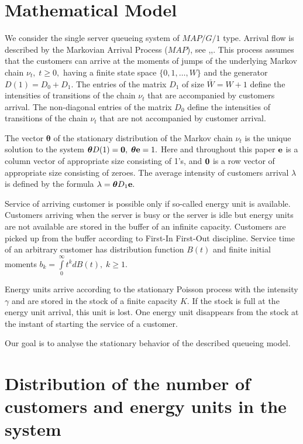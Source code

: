 \documentclass[runningheads]{llncs}
\begin{document}
\section{Mathematical Model}
We consider the single server queueing system of $MAP/G/1$ type. Arrival flow is described by the Markovian Arrival Process ($MAP$), see \cite{chak},\cite{luk},\cite{vd}. This process assumes that the customers can arrive at the moments of jumps of the underlying Markov chain $\nu_t,\; t \ge 0,$ having a finite state space $\{0,1,\dots,W\}$ and the generator $D(1)=D_0+D_1.$
The entries of the matrix $D_1$ of size $\bar W=W+1$ define the intensities of transitions of the chain $\nu_t$ that are accompanied by customers arrival. The non-diagonal entries of the matrix $D_0$  define the intensities of transitions of the chain $\nu_t$ that are not accompanied by customer arrival.


The vector ${\boldsymbol \theta}$ of the stationary distribution of the Markov chain $\nu_t$ is the unique solution to the system $\boldsymbol{\theta} D(1)={\bf 0},\; \boldsymbol{\theta}{\bf e}=1.$ Here and throughout this
paper  ${\bf e}$ is a column vector of appropriate size consisting
of 1's, and ${\bf 0}$ is a row vector of appropriate size consisting
of zeroes. The average intensity of  customers arrival
$\lambda$ is defined by the formula $\lambda=\boldsymbol{\theta} D_1 {\bf e}.$

Service of arriving customer is possible only if so-called energy unit is available. Customers arriving when the server is busy or the server is idle but energy units are not available are stored in the buffer of an infinite capacity. Customers are picked up from the buffer according to First-In First-Out discipline. Service time of an arbitrary customer has distribution function $B(t)$ and finite initial moments $b_k=\int\limits_{0}^{\infty} t^k dB(t),\; k \ge 1.$

Energy units arrive according to the stationary Poisson process with the intensity $\gamma$ and are stored in the stock of a finite capacity $K.$ If the stock is full at the energy unit arrival, this unit is lost. One energy unit disappears from the stock at the instant of starting the service of a customer.

Our goal is to analyse the stationary behavior of the described queueing model.


\section{Distribution of the number of customers and energy units in the system}
\end{document}
